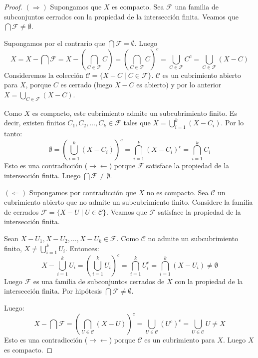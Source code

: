 \begin{proof}
    $(\Rightarrow)$ Supongamos que $X$ es compacto. Sea $\mathcal{F}$ una familia de subconjuntos cerrados con la propiedad de la intersección finita. Veamos que $\bigcap \mathcal{F} \ne \emptyset$.
    
    Supongamos por el contrario que $\bigcap \mathcal{F} = \emptyset$. Luego
    \[X = X - \bigcap \mathcal{F} = X - \left( \bigcap_{C \in \mathcal{F}} C \right) = \left( \bigcap_{C \in \mathcal{F}} C \right)^c = \bigcup_{C \in \mathcal{F}} C^c = \bigcup_{C \in \mathcal{F}} (X - C)\]
    Consideremos la colección $\mathcal{C} = \{ X - C \mid C \in \mathcal{F} \}$. $\mathcal{C}$ es un cubrimiento abierto para $X$, porque $C$ es cerrado (luego $X - C$ es abierto) y por lo anterior $X = \bigcup_{C \in \mathcal{F}} (X - C)$.
    
    Como $X$ es compacto, este cubrimiento admite un subcubrimiento finito. Es decir, existen finitos $C_1, C_2, \dots, C_k \in \mathcal{F}$ tales que $X = \bigcup_{i=1}^k (X - C_i)$.
    Por lo tanto:
    \[\emptyset = \left( \bigcup_{i=1}^k (X - C_i) \right)^c = \bigcap_{i=1}^k (X - C_i)^c = \bigcap_{i=1}^k C_i\]
    Esto es una contradicción ($\rightarrow\leftarrow$) porque $\mathcal{F}$ satisface la propiedad de la intersección finita. Luego $\bigcap \mathcal{F} \ne \emptyset$.

    \vspace{0.5cm}
    
    $(\Leftarrow)$ Supongamos por contradicción que $X$ no es compacto. Sea $\mathcal{C}$ un cubrimiento abierto que no admite un subcubrimiento finito. Considere la familia de cerrados $\mathcal{F} = \{ X - U \mid U \in \mathcal{C} \}$. Veamos que $\mathcal{F}$ satisface la propiedad de la intersección finita. 
    
    Sean $X - U_1, X - U_2, \dots, X - U_k \in \mathcal{F}$. Como $\mathcal{C}$ no admite un subcubrimiento finito, $X \ne \bigcup_{i=1}^k U_i$. Entonces:
    \[X - \bigcup_{i=1}^k U_i = \left( \bigcup_{i=1}^k U_i \right)^c = \bigcap_{i=1}^k U_i^c = \bigcap_{i=1}^k (X - U_i) \ne \emptyset\]
    Luego $\mathcal{F}$ es una familia de subconjuntos cerrados de $X$ con la propiedad de la intersección finita. Por hipótesis $\bigcap \mathcal{F} \ne \emptyset$.
    
    Luego:
    \[X - \bigcap \mathcal{F} = \left( \bigcap_{U \in \mathcal{C}} (X - U) \right)^c = \bigcup_{U \in \mathcal{C}} (U^c)^c = \bigcup_{U \in \mathcal{C}} U \ne X\]
    Esto es una contradicción ($\rightarrow\leftarrow$) porque $\mathcal{C}$ es un cubrimiento para $X$. Luego $X$ es compacto.
\end{proof}

